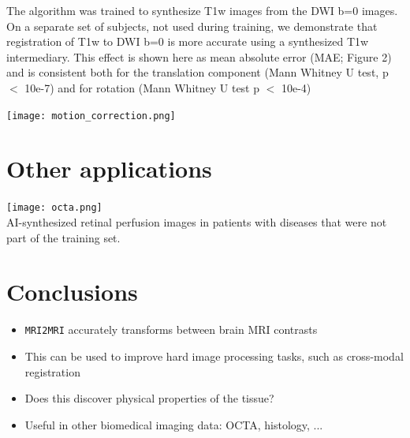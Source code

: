 \documentclass[a0, portrait]{a0poster}
\begin{document}
\begin{multicols}{2}
The algorithm was trained to synthesize T1w images from the DWI b=0 images. On a separate set of subjects, not used during training, we demonstrate that registration of T1w to DWI b=0 is more accurate using a synthesized T1w intermediary. This effect is shown here as mean absolute error (MAE; Figure 2) and is consistent both for the translation component (Mann Whitney U test, p $<$ 10e-7) and for rotation (Mann Whitney U test p $<$ 10e-4)

\begin{minipage}[t]{1.0\linewidth}
    \texttt{[image: motion\_correction.png]}
\end{minipage}

\section*{Other applications}

\begin{minipage}[t]{1\linewidth}
\texttt{[image: octa.png]}
\\
AI-synthesized retinal perfusion images in patients with diseases that were not part of the training set.
\end{minipage}

\color{SaddleBrown} %

\section*{Conclusions}

\large
\begin{itemize}

\item \texttt{MRI2MRI} accurately transforms between brain MRI contrasts

\item This can be used to improve hard image processing tasks, such as cross-modal registration

\item Does this discover physical properties of the tissue?

\item Useful in other biomedical imaging data: OCTA, histology, ...

\end{itemize}

\color{DarkSlateGray} %


\nocite{*} %
\footnotesize  %



\end{multicols}
\end{document}
